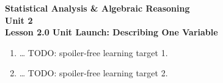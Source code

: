 \documentclass[10pt]{article}
\begin{document}
\vspace{-0.8in}

\begin{center}
  {\color{white}\textbf{\LARGE Statistical Analysis \& Algebraic Reasoning}}\\[4pt]
  {\color{frostmid}\large\textbf{Unit 2}}\\[6pt]
  {\color{white}\textbf{\large Lesson 2.0 \quad Unit Launch: Describing One Variable}}
\end{center}

\vspace{0.22in}
\namedateperiod
\vspace{0.18in}

\begin{learningtargetbox}
\small
\begin{enumerate}[leftmargin=1.5em, itemsep=5pt]
  \item \ldots{} TODO: spoiler-free learning target 1.
  \item \ldots{} TODO: spoiler-free learning target 2.
\end{enumerate}
\end{learningtargetbox}

\vspace{0.14in}
\end{document}
